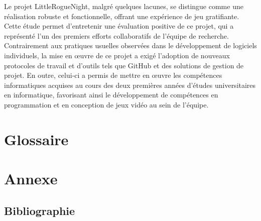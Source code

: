 \documentclass[10pt]{article}
\begin{document}
Le projet LittleRogueNight, malgré quelques lacunes, se distingue comme une réalisation robuste et fonctionnelle, offrant une expérience de jeu gratifiante. Cette étude permet d'entretenir une évaluation positive de ce projet, qui a représenté l'un des premiers efforts collaboratifs de l'équipe de recherche. Contrairement aux pratiques usuelles observées dans le développement de logiciels individuels, la mise en œuvre de ce projet a exigé l'adoption de nouveaux protocoles de travail et d'outils tels que GitHub et des solutions de gestion de projet. En outre, celui-ci a permis de mettre en œuvre les compétences informatiques acquises au cours des deux premières années d'études universitaires en informatique, favorisant ainsi le développement de compétences en programmation et en conception de jeux vidéo au sein de l'équipe.

\clearpage

\section{Glossaire}
\printglossary

\section{Annexe}
\subsection{Bibliographie}
\end{document}
